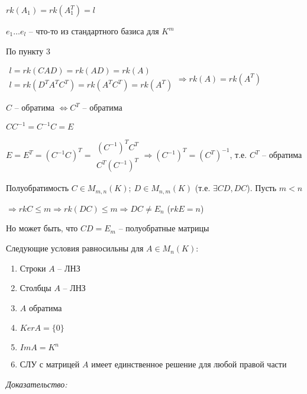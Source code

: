 \documentclass[12pt]{article}
\begin{document}
\begin{enumerate}
    $rk(A_1) = rk(A_1^T) = l$

    $e_1 \ldots e_l$ -- что-то из стандартного базиса для $K^m$

    По пункту 3
    
    $\begin{gathered}
        l = rk(CAD) = rk(AD) = rk(A) \\
        l = rk(D^TA^TC^T) = rk(A^TC^T) = rk(A^T)
    \end{gathered} \Rightarrow rk(A) = rk(A^T)$

    \begin{Remark}{}
        $C$ -- обратима $\Leftrightarrow C^T$ -- обратима

        $CC^{-1} = C^{-1}C = E$

        $E = E^T = (C^{-1}C)^T = \begin{gathered}
            (C^{-1})^TC^T \\
            C^T(C^{-1})^T
        \end{gathered} \Rightarrow (C^{-1})^T = (C^T)^{-1}$, т.е. $C^T$ -- обратима
    \end{Remark}
\end{enumerate}

\begin{Remark}{Полуобратимость}
    $C \in M_{m, n}(K);\ D \in M_{n, m}(K)$ (т.е. $\exists CD, DC$). Пусть $m < n$

    $\Rightarrow rkC \leq m \Rightarrow rk(DC) \leq m \Rightarrow DC \neq E_n$ ($rkE = n$)

    Но может быть, что $CD = E_m$ -- полуобратные матрицы
\end{Remark}

\begin{theo}{}
    Следующие условия равносильны для $A \in M_n(K)$:

    \begin{enumerate}
        \item Строки $A$ -- ЛНЗ
        \item Столбцы $A$ -- ЛНЗ
        \item $A$ обратима
        \item $KerA = \{0\}$
        \item $ImA = K^n$
        \item СЛУ с матрицей $A$ имеет единственное решение для любой правой части 
    \end{enumerate}
\end{theo}

\textit{Доказательство:}
\end{document}
